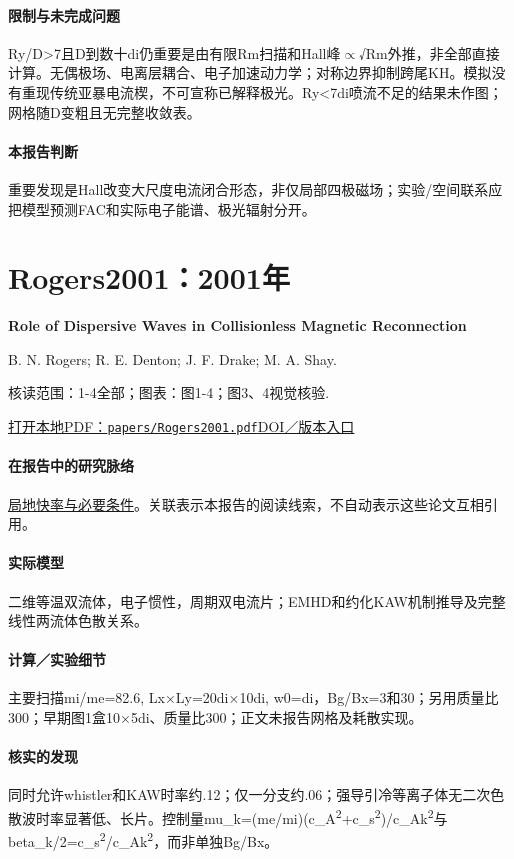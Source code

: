 \paragraph{限制与未完成问题}Ry/D>7且D到数十di仍重要是由有限Rm扫描和Hall峰\ensuremath{\propto}√Rm外推，非全部直接计算。无偶极场、电离层耦合、电子加速动力学；对称边界抑制跨尾KH。模拟没有重现传统亚暴电流楔，不可宣称已解释极光。Ry<7di喷流不足的结果未作图；网格随D变粗且无完整收敛表。

\paragraph{本报告判断}重要发现是Hall改变大尺度电流闭合形态，非仅局部四极磁场；实验/空间联系应把模型预测FAC和实际电子能谱、极光辐射分开。

\section{Rogers2001：2001年}\label{paper:Rogers2001}

\textbf{Role of Dispersive Waves in Collisionless Magnetic Reconnection}\citep{Rogers2001}\

B. N. Rogers;  R. E. Denton;  J. F. Drake;  M. A. Shay.

\textsf{核读范围：}1-4全部；\textsf{图表：}图1-4；图3、4视觉核验.

\href{run:papers/Rogers2001.pdf}{打开本地PDF：\texttt{papers/Rogers2001.pdf}}\quad\href{https://doi.org/10.1103/physrevlett.87.195004}{DOI／版本入口}

\paragraph{在报告中的研究脉络}\hyperref[story:fast]{局地快率与必要条件}。关联表示本报告的阅读线索，不自动表示这些论文互相引用。

\paragraph{实际模型}二维等温双流体，电子惯性，周期双电流片；EMHD和约化KAW机制推导及完整线性两流体色散关系。

\paragraph{计算／实验细节}主要扫描mi/me=82.6, Lx×Ly=20di×10di, w0=di，Bg/Bx=3和30；另用质量比300；早期图1盒10×5di、质量比300；正文未报告网格及耗散实现。

\paragraph{核实的发现}同时允许whistler和KAW时率约.12；仅一分支约.06；强导引冷等离子体无二次色散波时率显著低、长片。控制量mu\_k=(me/mi)(c\_A\textsuperscript{2}+c\_s\textsuperscript{2})/c\_Ak\textsuperscript{2}与beta\_k/2=c\_s\textsuperscript{2}/c\_Ak\textsuperscript{2}，而非单独Bg/Bx。

